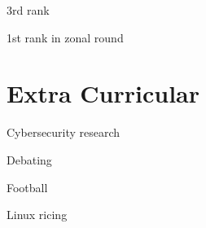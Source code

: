 \documentclass[]{deedy-resume-openfont}
\begin{document}
\begin{minipage}[t]{0.4\textwidth}
\begin{tightemize}
		\item {}
		3rd rank

		\item {}
		1st rank in zonal round

	\end{tightemize}
	\sectionsep

	\section{Extra Curricular}
	\sectionsep
	\begin{tightemize}
		\item Cybersecurity research
		\item Debating
		\item Football
		\item Linux ricing
	\end{tightemize}
	\sectionsep

\end{minipage}
\end{document}
